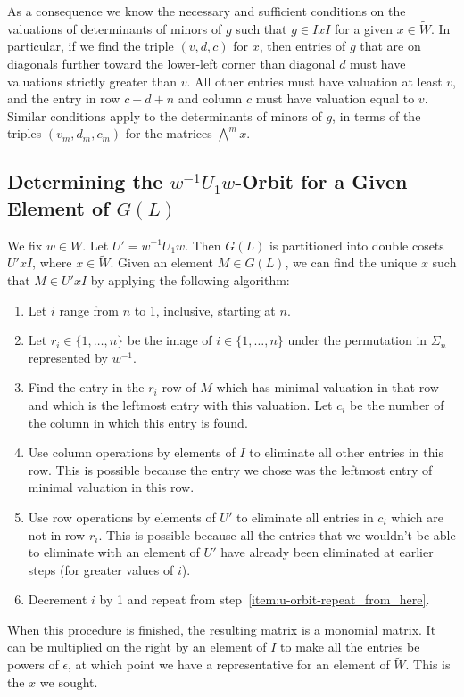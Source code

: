 \documentclass{amsart}
\theoremstyle{definition}
\def\e{\epsilon}
\def\W{\widetilde{W}}
\def\bw{\bigwedge^m\!}
\begin{document}
  As a consequence we know the necessary and sufficient conditions on the
  valuations of determinants of minors of $g$ such that $g \in IxI$ for a given
  $x \in \W$.  In particular, if we find the triple $(v, d, c)$ for $x$, then
  entries of $g$ that are on diagonals further toward the lower-left corner
  than diagonal $d$ must have valuations strictly greater than $v$.  All other
  entries must have valuation at least $v$, and the entry in row $c - d + n$
  and column $c$ must have valuation equal to $v$.  Similar conditions apply
  to the determinants of minors of $g$, in terms of the triples $(v_m, d_m,
  c_m)$  for the matrices $\bw x$.

  \subsection{Determining the $w^{-1}U_1 w$-Orbit for a Given Element of $G(L)$}
  \label{sec:DeterminingUOrbitForElement}
  We fix $w \in W$.  Let $U' = w^{-1}U_1 w$.  Then $G(L)$ is partitioned into
  double cosets $U'xI$, where $x \in \W$.  Given an element $M \in G(L)$, we
  can find the unique $x$ such that $M \in U'xI$ by applying the following
  algorithm:
  \begin{enumerate}
    \item Let $i$ range from $n$ to 1, inclusive, starting at $n$.
    \item \label{item:u-orbit-repeat_from_here} Let $r_i \in \{1, \ldots, n\}$
      be the image of $i \in \{1, \ldots, n\}$ under the permutation in
      $\Sigma_n$ represented by $w^{-1}$.
    \item Find the entry in the $r_i$ row of $M$ which has minimal valuation in
      that row and which is the leftmost entry with this valuation.  Let $c_i$
      be the number of the column in which this entry is found.
    \item Use column operations by elements of $I$ to eliminate all other
      entries in this row.  This is possible because the entry we chose was the
      leftmost entry of minimal valuation in this row.
    \item Use row operations by elements of $U'$ to eliminate all entries in
      $c_i$ which are not in row $r_i$.  This is possible because all the
      entries that we wouldn't be able to eliminate with an element of $U'$
      have already been eliminated at earlier steps (for greater values of
      $i$).
    \item Decrement $i$ by 1 and repeat from
    step~\ref{item:u-orbit-repeat_from_here}.
  \end{enumerate}
  When this procedure is finished, the resulting matrix is a monomial matrix.
  It can be multiplied on the right by an element of $I$ to make all the
  entries be powers of $\e$, at which point we have a representative for an
  element of $\W$.  This is the $x$ we sought.
\end{document}
